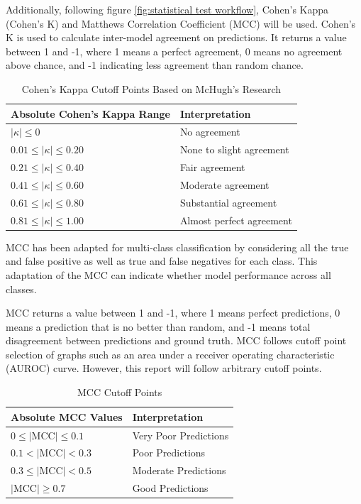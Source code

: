 \documentclass[10.7pt, onecolumn]{article}
\begin{document}
Additionally, following figure \ref{fig:statistical test workflow}, Cohen's Kappa\cite{d4} (Cohen's K) and Matthews Correlation Coefficient (MCC) will be used. Cohen's K is used to calculate inter-model agreement on predictions. It returns a value between 1 and -1, where 1 means a perfect agreement, 0 means no agreement above chance, and -1 indicating less agreement than random chance.

\begin{table}[H]
  \centering
  \small
  \begin{tabular}{|p{4cm}|p{3cm}|}
    \hline
    \textbf{Absolute Cohen's Kappa Range} & \textbf{Interpretation} \\
    \hline
    $|\kappa| \leq 0$ & No agreement \\
    \hline
    $0.01 \leq |\kappa| \leq 0.20$ & None to slight agreement \\
    \hline
    $0.21 \leq |\kappa| \leq 0.40$ & Fair agreement \\
    \hline
    $0.41 \leq |\kappa| \leq 0.60$ & Moderate agreement \\
    \hline
    $0.61 \leq |\kappa| \leq 0.80$ & Substantial agreement \\
    \hline
    $0.81 \leq |\kappa| \leq 1.00$ & Almost perfect agreement \\
    \hline
  \end{tabular}
  \caption{Cohen's Kappa Cutoff Points Based on McHugh's Research \cite{cohen}}
  \label{tab:kappaInterpretation}
\end{table}

MCC has been adapted for multi-class classification by considering all the true and false positive as well as true and false negatives for each class\cite{mccmulticlass}. This adaptation of the MCC can indicate whether model performance across all classes.

MCC returns a value between 1 and -1, where 1 means perfect predictions, 0 means a prediction that is no better than random, and -1 means total disagreement between predictions and ground truth. MCC follows cutoff point selection of graphs such as an area under a receiver operating characteristic (AUROC) curve\cite{articlesss}\cite{Yang_Berdine_2017}. However, this report will follow arbitrary cutoff points.

\begin{table}[H]
  \centering
  \small
  \begin{tabular}{|p{4cm}|p{3cm}|}
    \hline
    \textbf{Absolute MCC Values} & \textbf{Interpretation} \\
    \hline
    $0 \leq |\text{MCC}| \leq 0.1$ & Very Poor Predictions \\
    \hline
    $0.1 < |\text{MCC}| < 0.3$ & Poor Predictions \\
    \hline
    $0.3 \leq |\text{MCC}| < 0.5$ & Moderate Predictions \\
    \hline
    $|\text{MCC}| \geq 0.7$ & Good Predictions \\
    \hline
  \end{tabular}
  \caption{MCC Cutoff Points}
  \label{tab:mccInterpretation}
\end{table}
\end{document}
